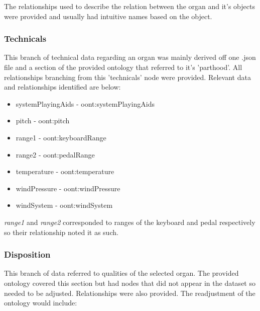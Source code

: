 The relationships used to describe the relation between the organ and it's objects were provided and usually had intuitive names based on the object. 

\subsubsection{Technicals}
\hspace*{0.5cm} This branch of technical data regarding an organ was mainly derived off one .json file and a section of the provided ontology that referred to it's 'parthood'. All relationships branching from this 'technicals' node were provided. Relevant data and relationships identified are below:

\vspace{-0.1cm}
\begin{itemize}
    \itemsep0em 
    \item systemPlayingAids - oont:systemPlayingAids
    \vspace{-0.05cm}
    \item pitch - oont:pitch
    \vspace{-0.05cm}
    \item range1 -  oont:keyboardRange
    \vspace{-0.05cm}
    \item range2 - oont:pedalRange
    \vspace{-0.05cm}
    \item temperature - oont:temperature
    \vspace{-0.05cm}
    \item windPressure - oont:windPressure
    \vspace{-0.05cm}
    \item windSystem - oont:windSystem
\end{itemize}

\textit{range1} and \textit{range2} corresponded to ranges of the keyboard and pedal respectively so their relationship noted it as such. 

\subsubsection{Disposition}
\hspace*{0.5cm} This branch of data referred to qualities of the selected organ. The provided ontology covered this section but had nodes that did not appear in the dataset so needed to be adjusted. Relationships were also provided. The readjustment of the ontology would include:


